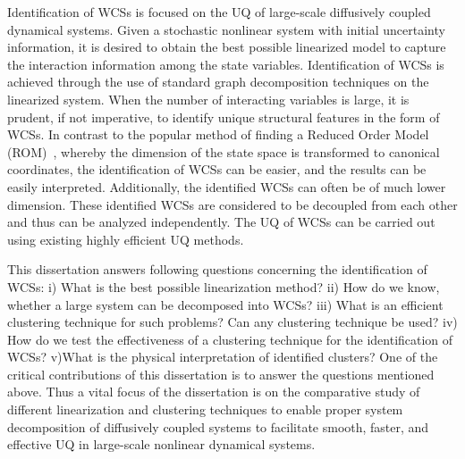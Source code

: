 Identification of WCSs is focused on the UQ of large-scale diffusively coupled dynamical systems. Given a stochastic nonlinear system with initial uncertainty information, it is desired to obtain the best possible linearized model to capture the interaction information among the state variables. Identification of WCSs is achieved through the use of standard graph decomposition techniques on the linearized system. When the number of interacting variables is large, it is prudent, if not imperative, to identify unique structural features in the form of WCSs. In contrast to the popular method of finding a Reduced Order Model (ROM)~\cite{wang2011two,carlberg2013gnat,matthies2003nonlinear,krack2013reduced}, whereby the dimension of the state space is transformed to canonical coordinates, the identification of WCSs can be easier, and the results can be easily interpreted. Additionally, the identified WCSs can often be of much lower dimension. These identified WCSs are considered to be decoupled from each other and thus can be analyzed independently. The UQ of WCSs can be carried out using existing highly efficient UQ methods.

This dissertation answers following questions concerning the identification of WCSs: i) What is the best possible linearization method? ii) How do we know, whether a large system can be decomposed into WCSs? iii)  What is an efficient clustering technique for such problems? Can any clustering technique be used? iv) How do we test the effectiveness of a clustering technique for the identification of WCSs? v)What is the physical interpretation of identified clusters? One of the critical contributions of this dissertation is to answer the questions mentioned above. Thus a vital focus of the dissertation is on the comparative study of different linearization and clustering techniques to enable proper system decomposition of diffusively coupled systems to facilitate smooth, faster, and effective UQ in large-scale nonlinear dynamical systems. 

